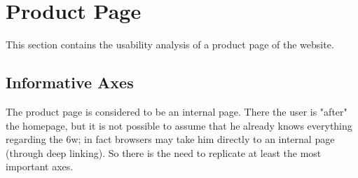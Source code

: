 \section{Product Page}
This section contains the usability analysis of a product page of the website.

\subsection{Informative Axes}
The product page is considered to be an internal page. There the user is "after" the homepage, but it is not possible to assume that he already knows everything regarding the 6w; in fact browsers may take him directly to an internal page (through deep linking). So there is the need to replicate at least the most important axes.




